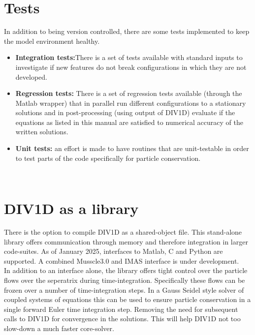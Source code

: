 \documentclass[amsmath,amssymb,a4]{revtex4-2}
\begin{document}
\section{Tests} 
In addition to being version controlled, there are some tests implemented to keep the model environment healthy.\\
\begin{itemize}
    \item \textbf{Integration tests:}There is a set of tests available with standard inputs to investigate if new features do not break configurations in which they are not developed.
    \item \textbf{Regression tests:} There is a set of regression tests available (through the Matlab wrapper) that in parallel run different configurations to a stationary solutions and in post-processing (using output of DIV1D) evaluate if the equations as listed in this manual are satisfied to numerical accuracy of the written solutions.
    \item \textbf{Unit tests:} an effort is made to have routines that are unit-testable in order to test parts of the code specifically for particle conservation.
\end{itemize}
\\

\section{DIV1D as a library}
\noindent There is the option to compile DIV1D as a shared-object file. This stand-alone library offers communication through memory and therefore integration in larger code-suites. As of January 2025, interfaces to Matlab, C and Python are supported. A combined Musscle3.0 and IMAS interface is under development. \\

\noindent In addition to an interface alone, the library offers tight control over the particle flows over the seperatrix during time-integration. Specifically these flows can be frozen over a number of time-integration steps. In a Gauss Seidel style solver of coupled systems of equations this can be used to ensure particle conservation in a single forward Euler time integration step. Removing the need for subsequent calls to DIV1D for convergence in the solutions. This will help DIV1D not too slow-down a much faster core-solver.\\
\end{document}
